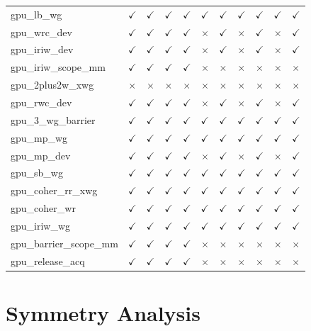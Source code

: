 \documentclass[10pt]{article}
\newcommand{\cmark}{$\checkmark$}
\newcommand{\xmark}{$\times$}
\begin{document}
{\begin{table}[p]
\begin{tabular}{l cccc cccccc}
gpu\_lb\_wg & \cmark & \cmark & \cmark & \cmark & \cmark & \cmark & \cmark & \cmark & \cmark & \cmark \\
gpu\_wrc\_dev & \cmark & \cmark & \cmark & \cmark & \xmark & \cmark & \xmark & \cmark & \xmark & \cmark \\
gpu\_iriw\_dev & \cmark & \cmark & \cmark & \cmark & \xmark & \cmark & \xmark & \cmark & \xmark & \cmark \\
gpu\_iriw\_scope\_mm & \cmark & \cmark & \cmark & \cmark & \xmark & \xmark & \xmark & \xmark & \xmark & \xmark \\
gpu\_2plus2w\_xwg & \xmark & \xmark & \xmark & \xmark & \xmark & \xmark & \xmark & \xmark & \xmark & \xmark \\
gpu\_rwc\_dev & \cmark & \cmark & \cmark & \cmark & \xmark & \cmark & \xmark & \cmark & \xmark & \cmark \\
gpu\_3\_wg\_barrier & \cmark & \cmark & \cmark & \cmark & \cmark & \cmark & \cmark & \cmark & \cmark & \cmark \\
gpu\_mp\_wg & \cmark & \cmark & \cmark & \cmark & \cmark & \cmark & \cmark & \cmark & \cmark & \cmark \\
gpu\_mp\_dev & \cmark & \cmark & \cmark & \cmark & \xmark & \cmark & \xmark & \cmark & \xmark & \cmark \\
gpu\_sb\_wg & \cmark & \cmark & \cmark & \cmark & \cmark & \cmark & \cmark & \cmark & \cmark & \cmark \\
gpu\_coher\_rr\_xwg & \cmark & \cmark & \cmark & \cmark & \cmark & \cmark & \cmark & \cmark & \cmark & \cmark \\
gpu\_coher\_wr & \cmark & \cmark & \cmark & \cmark & \cmark & \cmark & \cmark & \cmark & \cmark & \cmark \\
gpu\_iriw\_wg & \cmark & \cmark & \cmark & \cmark & \cmark & \cmark & \cmark & \cmark & \cmark & \cmark \\
gpu\_barrier\_scope\_mm & \cmark & \cmark & \cmark & \cmark & \xmark & \xmark & \xmark & \xmark & \xmark & \xmark \\
gpu\_release\_acq & \cmark & \cmark & \cmark & \cmark & \xmark & \xmark & \xmark & \xmark & \xmark & \xmark \\
\bottomrule
\end{tabular}
\end{table}
}

\section{Symmetry Analysis}
\label{app:symmetry}
\end{document}
